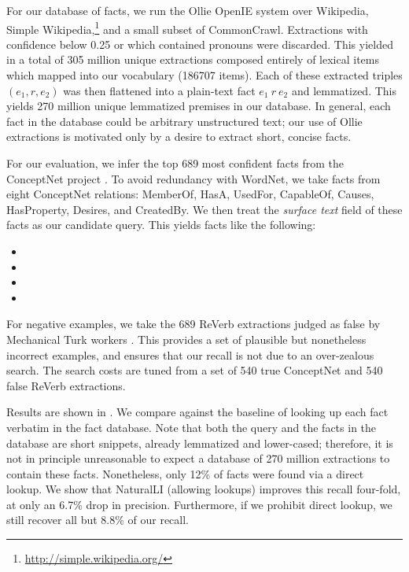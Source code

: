 For our database of facts, we run the Ollie OpenIE system
  \cite{key:2012mausam-ollie} over Wikipedia, Simple Wikipedia,\footnote{
    \url{http://simple.wikipedia.org/}
  }
  and a small subset of CommonCrawl.
Extractions with confidence below 0.25 or which contained
  pronouns were discarded.
This yielded in a total of 305 million unique extractions composed
  entirely of lexical items which mapped into our vocabulary
  (\num{186707} items).
Each of these extracted triples $(e_1,r,e_2)$ was then flattened into
  a plain-text fact $e_1~r~e_2$ and lemmatized.
This yields \num{270} million unique lemmatized premises in our database.
In general, each fact in the database could be arbitrary unstructured
  text; our use of Ollie extractions is motivated only by a desire to
  extract short, concise facts.

For our evaluation, we infer the top 689 most confident facts from
  the ConceptNet project \cite{key:2011tandon-conceptnet}.
To avoid redundancy with WordNet, we take facts from eight
  ConceptNet relations: 
    MemberOf,
    HasA,
    UsedFor,
    CapableOf,
    Causes,
    HasProperty,
    Desires, and 
    CreatedBy.
We then treat the \textit{surface text} field of these facts as our
  candidate query.
This yields facts like the following:

\vspace{-0.25em}
\begin{itemize}
\setlength{\itemsep}{-4pt}
\item[] 
\item[] 
\item[] 
\item[] 
\end{itemize}
\vspace{-0.25em}

For negative examples, we take the 689 ReVerb extractions
  \cite{key:2011fader-reverb}
  judged as false by Mechanical Turk workers \cite{key:2013angeli-truth}.
This provides a set of plausible but nonetheless incorrect examples,
  and ensures that our recall is not due to an over-zealous search.
The search costs are tuned from a set of 540 true ConceptNet and
  540 false ReVerb extractions.

Results are shown in .
We compare against the baseline of looking up each fact verbatim in the
  fact database.
Note that both the query and the facts in the database are 
  short snippets, already lemmatized and lower-cased;
  therefore, it is not in principle unreasonable to
  expect a database of 270 million extractions to contain these facts.
Nonetheless, only 12\% of facts were found via a direct lookup.
We show that NaturalLI (allowing lookups) improves this recall
  four-fold, at only an 6.7\% drop in precision.
Furthermore, if we prohibit direct lookup,
  we still recover all but 8.8\% of our recall.



